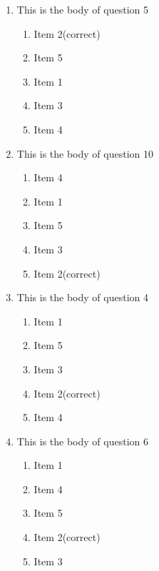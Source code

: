 \documentclass[amsfonts,bezier,leqno,fleqn,12pt,a4paper]{article}
\begin{document}
{\begin{large}
\begin{enumerate}
\begin{enumerate}
\end{enumerate}

\vspace {3.5cm}


\item This is the body of question 5
\vspace {0.3in}
\setcounter{equation}{0}

\begin{enumerate}
\item  Item 2\hfill {\small (correct)}
\item  Item 5
\item  Item 1
\item  Item 3
\item  Item 4

\end{enumerate}
\newpage


\item This is the body of question 10
\vspace {0.3in}
\setcounter{equation}{0}

\begin{enumerate}
\item  Item 4
\item  Item 1
\item  Item 5
\item  Item 3
\item  Item 2\hfill {\small (correct)}

\end{enumerate}

\vspace {3.5cm}


\item This is the body of question 4
\vspace {0.3in}
\setcounter{equation}{0}

\begin{enumerate}
\item  Item 1
\item  Item 5
\item  Item 3
\item  Item 2\hfill {\small (correct)}
\item  Item 4

\end{enumerate}
\newpage


\item This is the body of question 6
\vspace {0.3in}
\setcounter{equation}{0}

\begin{enumerate}
\item  Item 1
\item  Item 4
\item  Item 5
\item  Item 2\hfill {\small (correct)}
\item  Item 3


\end{enumerate}
\end{enumerate}
\end{large}}
\end{document}
